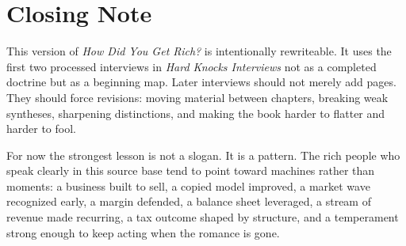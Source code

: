\documentclass[11pt,oneside]{book}
\begin{document}
\chapter*{Closing Note}

This version of \emph{How Did You Get Rich?} is intentionally rewriteable. It uses the first two processed interviews in \emph{Hard Knocks Interviews} not as a completed doctrine but as a beginning map. Later interviews should not merely add pages. They should force revisions: moving material between chapters, breaking weak syntheses, sharpening distinctions, and making the book harder to flatter and harder to fool.

For now the strongest lesson is not a slogan. It is a pattern. The rich people who speak clearly in this source base tend to point toward machines rather than moments: a business built to sell, a copied model improved, a market wave recognized early, a margin defended, a balance sheet leveraged, a stream of revenue made recurring, a tax outcome shaped by structure, and a temperament strong enough to keep acting when the romance is gone.
\end{document}

